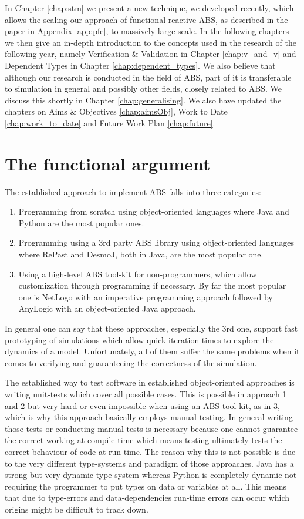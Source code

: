 \medskip

In Chapter \ref{chap:stm} we present a new technique, we developed recently, which allows the scaling our approach of functional reactive ABS, as described in the paper in Appendix \ref{app:pfe}, to massively large-scale. In the following chapters we then give an in-depth introduction to the concepts used in the research of the following year, namely Verification \& Validation in Chapter \ref{chap:v_and_v} and Dependent Types in Chapter \ref{chap:dependent_types}. We also believe that although our research is conducted in the field of ABS, part of it is transferable to simulation in general and possibly other fields, closely related to ABS. We discuss this shortly in Chapter \ref{chap:generalising}. We also have updated the chapters on Aims \& Objectives \ref{chap:aimsObj}, Work to Date \ref{chap:work_to_date} and Future Work Plan \ref{chap:future}.

\section{The functional argument}
\label{sect:argument}
The established approach to implement ABS falls into three categories:
\begin{enumerate}
	\item Programming from scratch using object-oriented languages where Java and Python are the most popular ones.
	\item Programming using a 3rd party ABS library using object-oriented languages where RePast and DesmoJ, both in Java, are the most popular one.
	\item Using a high-level ABS tool-kit for non-programmers, which allow customization through programming if necessary. By far the most popular one is NetLogo with an imperative programming approach followed by AnyLogic with an object-oriented Java approach.
\end{enumerate}

In general one can say that these approaches, especially the 3rd one, support fast prototyping of simulations which allow quick iteration times to explore the dynamics of a model. Unfortunately, all of them suffer the same problems when it comes to verifying and guaranteeing the correctness of the simulation.

The established way to test software in established object-oriented approaches is writing unit-tests which cover all possible cases. This is possible in approach 1 and 2 but very hard or even impossible when using an ABS tool-kit, as in 3, which is why this approach basically employs manual testing. In general writing those tests or conducting manual tests is necessary because one cannot guarantee the correct working at compile-time which means testing ultimately tests the correct behaviour of code at run-time. The reason why this is not possible is due to the very different type-systems and paradigm of those approaches. Java has a strong but very dynamic type-system whereas Python is completely dynamic not requiring the programmer to put types on data or variables at all. This means that due to type-errors and data-dependencies run-time errors can occur which origins might be difficult to track down.

